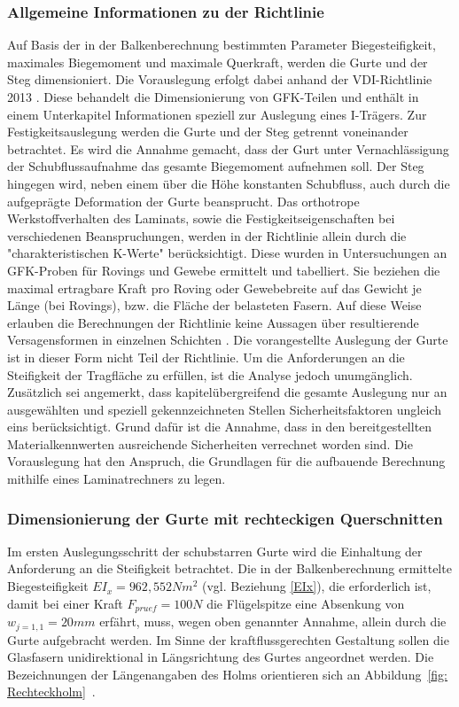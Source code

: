 \subsubsection{Allgemeine Informationen zu der Richtlinie}
Auf Basis der in der Balkenberechnung bestimmten Parameter Biegesteifigkeit, maximales Biegemoment und maximale Querkraft, werden die Gurte und der Steg dimensioniert. Die Vorauslegung erfolgt dabei anhand der VDI-Richtlinie 2013 \cite{item5}. Diese behandelt die Dimensionierung von GFK-Teilen und enthält in einem Unterkapitel Informationen speziell zur Auslegung eines I-Trägers. Zur Festigkeitsauslegung werden die Gurte und der Steg getrennt voneinander betrachtet. Es wird die Annahme gemacht, dass der Gurt unter Vernachlässigung der Schubflussaufnahme das gesamte Biegemoment aufnehmen soll. Der Steg hingegen wird, neben einem über die Höhe konstanten Schubfluss, auch durch die aufgeprägte Deformation der Gurte beansprucht. Das orthotrope Werkstoffverhalten des Laminats, sowie die Festigkeitseigenschaften bei verschiedenen Beanspruchungen, werden in der Richtlinie allein durch die "charakteristischen K-Werte" \cite{item5} berücksichtigt. Diese wurden in Untersuchungen an GFK-Proben für Rovings und Gewebe ermittelt und tabelliert. Sie beziehen die maximal ertragbare Kraft pro Roving oder Gewebebreite auf das Gewicht je Länge (bei Rovings), bzw. die Fläche der belasteten Fasern. Auf diese Weise erlauben die Berechnungen der Richtlinie keine Aussagen über resultierende Versagensformen in einzelnen Schichten \cite{item5}. Die vorangestellte Auslegung der Gurte ist in dieser Form nicht Teil der Richtlinie. Um die Anforderungen an die Steifigkeit der Tragfläche zu erfüllen, ist die Analyse jedoch unumgänglich.\\

\noindent Zusätzlich sei angemerkt, dass kapitelübergreifend die gesamte Auslegung nur an ausgewählten und speziell gekennzeichneten Stellen Sicherheitsfaktoren ungleich eins berücksichtigt. Grund dafür ist die Annahme, dass in den bereitgestellten Materialkennwerten ausreichende Sicherheiten verrechnet worden sind. 
Die Vorauslegung hat den Anspruch, die Grundlagen für die aufbauende Berechnung mithilfe eines Laminatrechners zu legen.

\subsubsection{Dimensionierung der Gurte mit rechteckigen Querschnitten}
\label{GurtDim} 
Im ersten Auslegungsschritt der schubstarren Gurte wird die Einhaltung der Anforderung an die Steifigkeit betrachtet.   
Die in der Balkenberechnung ermittelte Biegesteifigkeit $ EI_{x} = 962,552 Nm^{2} $ (vgl. Beziehung \ref{EIx}), die erforderlich ist, damit bei einer Kraft $ F_{pruef}=100N $ die Flügelspitze eine Absenkung von $ w_{j=1,1}=20mm $ erfährt, muss, wegen oben genannter Annahme, allein durch die Gurte aufgebracht werden. Im Sinne der kraftflussgerechten Gestaltung sollen die Glasfasern unidirektional in Längsrichtung des Gurtes angeordnet werden. Die Bezeichnungen der Längenangaben des Holms orientieren sich an Abbildung~\ref{fig: Rechteckholm}~.\\

